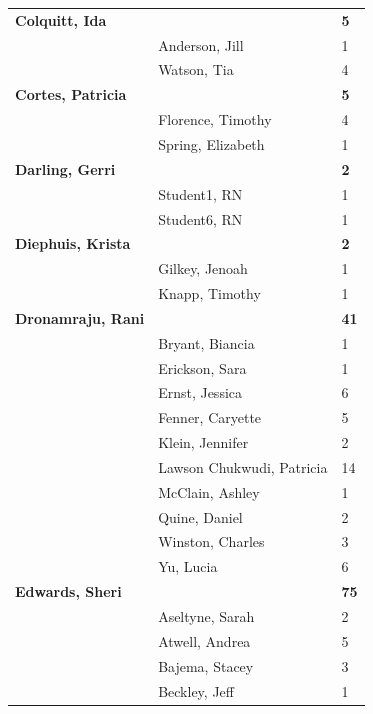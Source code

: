 \documentclass{article}\usepackage[]{graphicx}\usepackage[]{color}
\begin{document}
{\begin{longtable} { >{\raggedright}p{}|p{}p{}}
  \textbf{Colquitt, Ida} &  & \hspace{2cm}\textbf{5} \\ 
   \rowcolor[gray]{0.90} & Anderson, Jill & 1 \\ 
   \rowcolor[gray]{0.90} & Watson, Tia & 4 \\ 
   \rowcolor[gray]{0.90}\textbf{Cortes, Patricia} &  & \hspace{2cm}\textbf{5} \\ 
   & Florence, Timothy & 4 \\ 
   & Spring, Elizabeth & 1 \\ 
  \textbf{Darling, Gerri} &  & \hspace{2cm}\textbf{2} \\ 
   \rowcolor[gray]{0.90} & Student1, RN & 1 \\ 
   \rowcolor[gray]{0.90} & Student6, RN & 1 \\ 
   \rowcolor[gray]{0.90}\textbf{Diephuis, Krista} &  & \hspace{2cm}\textbf{2} \\ 
   & Gilkey, Jenoah & 1 \\ 
   & Knapp, Timothy & 1 \\ 
  \textbf{Dronamraju, Rani} &  & \hspace{2cm}\textbf{41} \\ 
   \rowcolor[gray]{0.90} & Bryant, Biancia & 1 \\ 
   \rowcolor[gray]{0.90} & Erickson, Sara & 1 \\ 
   \rowcolor[gray]{0.90} & Ernst, Jessica & 6 \\ 
   & Fenner, Caryette & 5 \\ 
   & Klein, Jennifer & 2 \\ 
   & Lawson Chukwudi, Patricia & 14 \\ 
   \rowcolor[gray]{0.90} & McClain, Ashley & 1 \\ 
   \rowcolor[gray]{0.90} & Quine, Daniel & 2 \\ 
   \rowcolor[gray]{0.90} & Winston, Charles & 3 \\ 
   & Yu, Lucia & 6 \\ 
  \textbf{Edwards, Sheri} &  & \hspace{2cm}\textbf{75} \\ 
   & Aseltyne, Sarah & 2 \\ 
   \rowcolor[gray]{0.90} & Atwell, Andrea & 5 \\ 
   \rowcolor[gray]{0.90} & Bajema, Stacey & 3 \\ 
   \rowcolor[gray]{0.90} & Beckley, Jeff & 1 \\ 

\end{longtable}}
\end{document}
